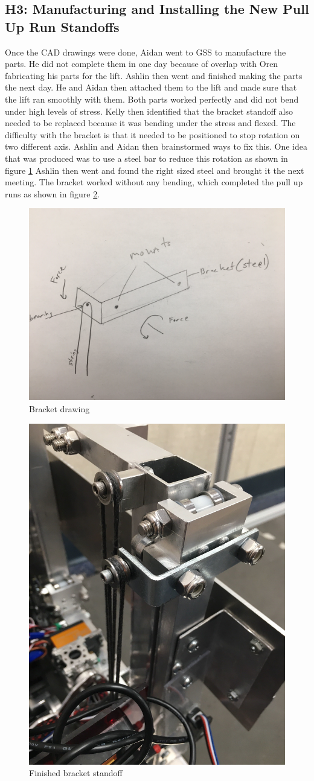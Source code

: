 \documentclass{article}
\begin{document}
\subsection{H3: Manufacturing and Installing the New Pull Up Run Standoffs}

Once the CAD drawings were done, Aidan went to GSS to manufacture the parts. He did not complete them in one day because of overlap with Oren fabricating his parts for the lift. Ashlin then went and finished making the parts the next day. He and Aidan then attached them to the lift and made sure that the lift ran smoothly with them. Both parts worked perfectly and did not bend under high levels of stress. Kelly then identified that the bracket standoff also needed to be replaced because it was bending under the stress and flexed. The difficulty with the bracket is that it needed to be positioned to stop rotation on two different axis. Ashlin and Aidan then brainstormed ways to fix this. One idea that was produced was to use a steel bar to reduce this rotation as shown in figure \ref{fig: bracket} Ashlin then went and found the right sized steel and brought it the next meeting. The bracket worked without any bending, which completed the pull up runs as shown in figure \ref{fig: bracket2}.
\begin{figure}
    \centering
    \includegraphics[width= 0.4 \textwidth]{26_02-25/images/Bracket.jpg}
    \caption{Bracket drawing}
    \label{fig: bracket}
\end{figure}
\begin{figure}
    \centering
    \includegraphics[width= 0.3 \textwidth]{26_02-25/images/Bracket2.jpg}
    \caption{Finished bracket standoff}
    \label{fig: bracket2}
\end{figure}
\end{document}
